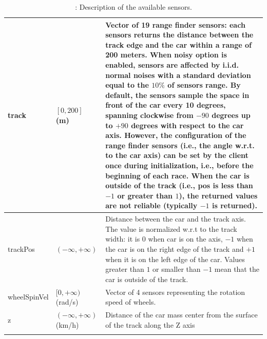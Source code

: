 \documentclass[declaration,shortabstract,english,inz]{iithesis}
\begin{document}
\begin{center}
\begin{longtable}{ | p{} |p{}| p{} |}
     \hline        
     track &  $[0, 200]$ (m) & Vector of 19 range finder sensors: each sensors returns the distance between the track edge and the car within a range of 200 meters. When noisy option is enabled, sensors are affected by i.i.d. normal noises with a standard deviation equal to the $10\%$ of sensors range. By default, the sensors sample the space in front of the car every 10 degrees, spanning clockwise from $-90$ degrees up to $+90$ degrees with respect to the car axis. However, the configuration of the range finder sensors (i.e., the angle w.r.t. to the car axis) can be set by the client once during initialization, i.e., before the beginning of each race. When the car is outside of the track (i.e., pos is less than $-1$ or greater than $1$), the returned values are not reliable (typically $-1$ is returned). \\
     \hline
     trackPos & $( -\infty, +\infty )$ & Distance between the car and the track axis. The value is normalized w.r.t to the track width: it is $0$ when car is on the axis, $-1$ when the car is on the right edge of the track and $+1$ when it is on the left edge of the car. Values greater than $1$ or smaller than $-1$ mean that the car is outside of the track. \\
     \hline
     wheelSpinVel & $[0, +\infty)$ (rad/s) & Vector of 4 sensors representing the rotation speed of wheels. \\
     \hline
     z & $( -\infty, +\infty ) $ (km/h) & Distance of the car mass center from the surface of the track
     along the Z axis \\
     \hline
     \caption{\label{tab:torcs_sensors}: Description of the available sensors.}
    \end{longtable}

\end{center}
\end{document}
